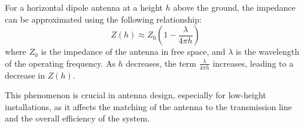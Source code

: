 For a horizontal dipole antenna at a height \( h \) above the ground, the impedance can be approximated using the following relationship:
\[
Z(h) \approx Z_0 \left(1 - \frac{\lambda}{4\pi h}\right)
\]
where \( Z_0 \) is the impedance of the antenna in free space, and \( \lambda \) is the wavelength of the operating frequency. As \( h \) decreases, the term \( \frac{\lambda}{4\pi h} \) increases, leading to a decrease in \( Z(h) \).

This phenomenon is crucial in antenna design, especially for low-height installations, as it affects the matching of the antenna to the transmission line and the overall efficiency of the system.

